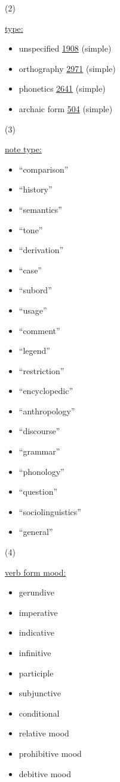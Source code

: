 \documentclass[a4paper,12pt]{article}
\begin{document}
\hypertarget{2}{(2)}
\hyperlink{type}{type:}
\begin{itemize}
\item unspecified \href{http://www.isocat.org/datcat/DC-1908}{1908} (simple)
\item orthography \href{http://www.isocat.org/datcat/DC-2971}{2971} (simple)
\item phonetics \href{http://www.isocat.org/datcat/DC-2641}{2641} (simple)
\item archaic form \href{http://www.isocat.org/datcat/DC-504}{504} (simple)
\end{itemize}

\hypertarget{3}{(3)}
\hyperlink{nt}{note type:}
\begin{itemize}
\item ``comparison''
\item ``history''
\item ``semantics''
\item ``tone''
\item ``derivation''
\item ``case''
\item ``subord''
\item ``usage''
\item ``comment''
\item ``legend''
\item ``restriction''
\item ``encyclopedic''
\item ``anthropology''
\item ``discourse''
\item ``grammar''
\item ``phonology''
\item ``question''
\item ``sociolinguistics''
\item ``general''
\end{itemize}

\hypertarget{4}{(4)}
\hyperlink{mood}{verb form mood:}
\begin{itemize}
\item gerundive
\item imperative
\item indicative
\item infinitive
\item participle
\item subjunctive
\item conditional
\item relative mood
\item prohibitive mood
\item debitive mood
\end{itemize}
\end{document}
